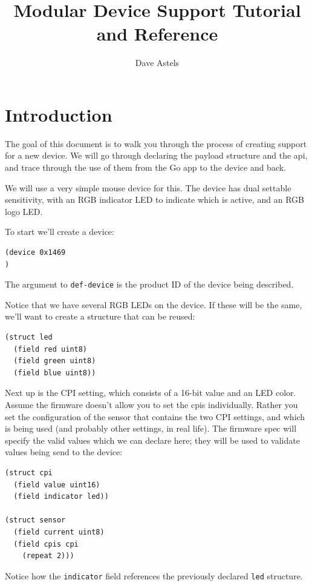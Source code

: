 \documentclass[12pt]{article}
\title{\SSEnext Modular Device Support Tutorial and Reference}
\author{Dave Astels}
\begin{document}
\maketitle

\section{Introduction}

The goal of this document is to walk you through the process of
creating support for a new device. We will go through declaring the
payload structure and the api, and trace through the use of them from
the Go app to the device and back.

We will use a very simple mouse device for this. The device has dual
settable sensitivity, with an RGB indicator LED to indicate which is active, and
an RGB logo LED.

To start we'll create a device:

\begin{verbatim}
(device 0x1469
)
\end{verbatim}

The argument to \verb|def-device| is the product ID of the device
being described.

Notice that we have several RGB LEDs on the device.  If these will be
the same, we'll want to create a structure that can be reused:

\begin{verbatim}
(struct led
  (field red uint8)
  (field green uint8)
  (field blue uint8))
\end{verbatim}

Next up is the CPI setting, which consists of a 16-bit value and an
LED color. Assume the firmware doesn't allow you to set the cpis
individually. Rather you set the configuration of the sensor that
contains the two CPI settings, and which is being used (and probably other settings, in real
life). The firmware spec will specify the valid values which we can
declare here; they will be used to validate values being send to the
device:

\begin{verbatim}
(struct cpi
  (field value uint16)
  (field indicator led))

(struct sensor
  (field current uint8)
  (field cpis cpi
    (repeat 2)))
\end{verbatim}

Notice how the \verb|indicator| field references the previously declared
\verb|led| structure.
\end{document}
